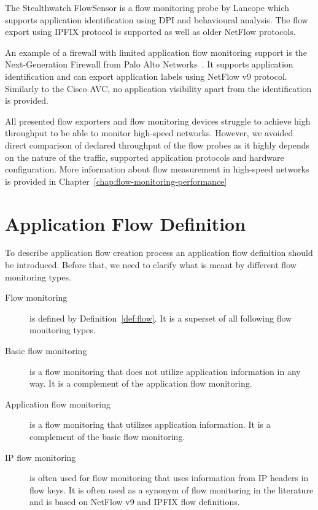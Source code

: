 The Stealthwatch FlowSensor\cite{Lancope--Stealthwatch} is a flow monitoring probe by Lancope which supports application identification using DPI and behavioural analysis. The flow export using IPFIX protocol is supported as well as older NetFlow protocols.

An example of a firewall with limited application flow monitoring support is the Next-Generation Firewall from Palo Alto Networks~\cite{PAN--Next}. It supports application identification and can export application labels using NetFlow v9 protocol. Similarly to the Cisco AVC, no application visibility apart from the identification is provided.

All presented flow exporters and flow monitoring devices struggle to achieve high throughput to be able to monitor high-speed networks. However, we avoided direct comparison of declared throughput of the flow probes as it highly depends on the nature of the traffic, supported application protocols and hardware configuration. More information about flow measurement in high-speed networks is provided in Chapter~\ref{chap:flow-monitoring-performance}

\section{Application Flow Definition}\label{sec:app-flow-definition}

To describe application flow creation process an application flow definition should be introduced. Before that, we need to clarify what is meant by different flow monitoring types.

\begin{description}
  \item[Flow monitoring] is defined by Definition~\ref{def:flow}. It is a superset of all following flow monitoring types.
  \item[Basic flow monitoring] is a flow monitoring that does not utilize application information in any way. It is a complement of the application flow monitoring.
  \item[Application flow monitoring] is a flow monitoring that utilizes application information. It is a complement of the basic flow monitoring. 
  \item[IP flow monitoring] is often used for flow monitoring that uses information from IP headers in flow keys. It is often used as a synonym of flow monitoring in the literature and is based on NetFlow v9 and IPFIX flow definitions.
\end{description}

